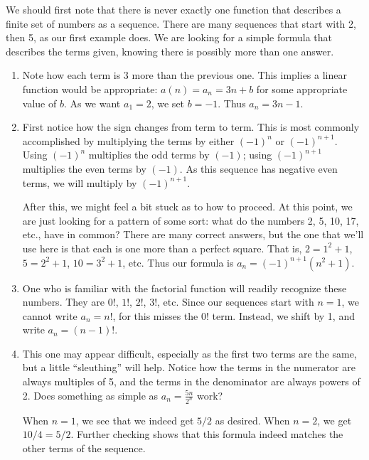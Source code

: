 {We should first note that there is never exactly one function that describes a finite set of numbers as a sequence. There are many sequences that start with 2, then 5, as our first example does. We are looking for a simple formula that describes the terms given, knowing there is possibly more than one answer.
\begin{enumerate}
\item		Note how each term is 3 more than the previous one. This implies a linear function would be appropriate: $a(n) = a_n = 3n + b$ for some appropriate value of $b$. As we want $a_1=2$, we set $b=-1$. Thus $a_n = 3n-1$.

\item		First notice how the sign changes from term to term. This is most commonly accomplished by multiplying the terms by either $(-1)^n$ or $(-1)^{n+1}$. Using $(-1)^n$ multiplies the odd terms by $(-1)$; using $(-1)^{n+1}$ multiplies the even terms by $(-1)$. As this sequence has negative even terms, we will multiply by $(-1)^{n+1}$. 

After this, we might feel a bit stuck as to how to proceed. At this point, we are just looking for a pattern of some sort: what do the numbers 2, 5, 10, 17, etc., have in common? There are many correct answers, but the one that we'll use here is that each is one more than a perfect square. That is, $2=1^2+1$, $5=2^2+1$, $10=3^2+1$, etc. Thus our formula is $a_n= (-1)^{n+1}(n^2+1)$.

\item		One who is familiar with the factorial function will readily recognize these numbers. They are $0!$, $1!$, $2!$, $3!$, etc. Since our sequences start with $n=1$, we cannot write $a_n = n!$, for this misses the $0!$ term. Instead, we shift by 1, and write $a_n = (n-1)!$.

\item		This one may appear difficult, especially as the first two terms are the same, but a little ``sleuthing'' will help. Notice how the terms in the numerator are always multiples of 5, and the terms in the denominator are always powers of 2. Does something as simple as $a_n = \frac{5n}{2^n}$ work?

When $n=1$, we see that we indeed get $5/2$ as desired. When $n=2$, we get $10/4 = 5/2$. Further checking shows that this formula indeed matches the other terms of the sequence.\eoehere
\end{enumerate}}

